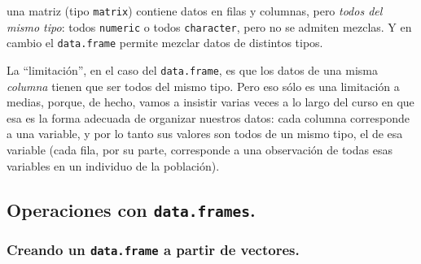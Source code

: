 \documentclass[10pt,a4paper]{article}\usepackage[]{graphicx}\usepackage[]{color}
\newcounter {cont01}
\begin{document}
%
%
una matriz (tipo {\tt matrix}) contiene datos en filas y columnas, pero {\em todos del mismo tipo}: todos {\tt numeric} o todos {\tt character}, pero no se admiten mezclas. Y en cambio el {\tt data.frame} permite mezclar datos de distintos tipos.

La ``limitación'', en el caso del {\tt data.frame}, es que los datos de una misma {\em columna} tienen que ser todos del mismo tipo. Pero eso sólo es una limitación a medias, porque, de hecho, vamos a insistir varias veces a lo largo del curso en que esa es la forma adecuada de organizar nuestros datos: cada columna corresponde a una variable, y por lo tanto sus valores son todos de un mismo tipo, el de esa variable (cada fila, por su parte, corresponde a una observación de todas esas variables en un individuo de la población).

\subsection{Operaciones con {\tt data.frames}.}
\label{tut04:subsec:OperacionesConDataFrames}

\subsubsection{Creando un {\tt data.frame} a partir de vectores.}
\label{tut04:subsubsec:CreandoDataFrameVectores}
\end{document}
